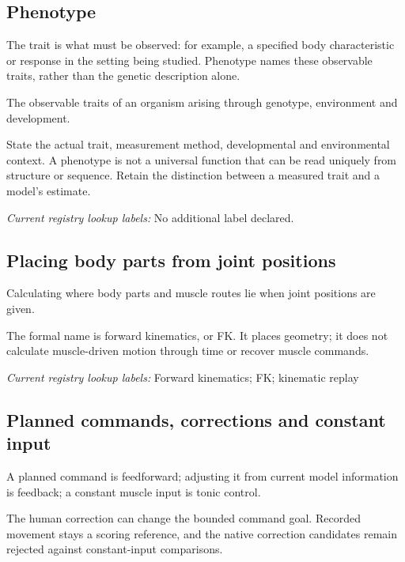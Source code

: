 \subsection*{Phenotype}
\noindent The trait is what must be observed: for example, a specified body characteristic or response in the setting being studied. Phenotype names these observable traits, rather than the genetic description alone.\par
\noindent The observable traits of an organism arising through genotype, environment and development.\par
\noindent State the actual trait, measurement method, developmental and environmental context. A phenotype is not a universal function that can be read uniquely from structure or sequence. Retain the distinction between a measured trait and a model’s estimate.\par


\noindent\textit{Current registry lookup labels:} No additional label declared.\par

\begin{samepage}
\subsection*{Placing body parts from joint positions}
\noindent Calculating where body parts and muscle routes lie when joint positions are given.\par
\end{samepage}
\begin{samepage}
\noindent The formal name is forward kinematics, or FK. It places geometry; it does not calculate muscle-driven motion through time or recover muscle commands.\par\nopagebreak[4]

\end{samepage}


\noindent\textit{Current registry lookup labels:} Forward kinematics; FK; kinematic replay\par

\begin{samepage}
\subsection*{Planned commands, corrections and constant input}
\noindent A planned command is feedforward; adjusting it from current model information is feedback; a constant muscle input is tonic control.\par
\end{samepage}
\begin{samepage}
\noindent The human correction can change the bounded command goal. Recorded movement stays a scoring reference, and the native correction candidates remain rejected against constant-input comparisons.\par\nopagebreak[4]

\end{samepage}



